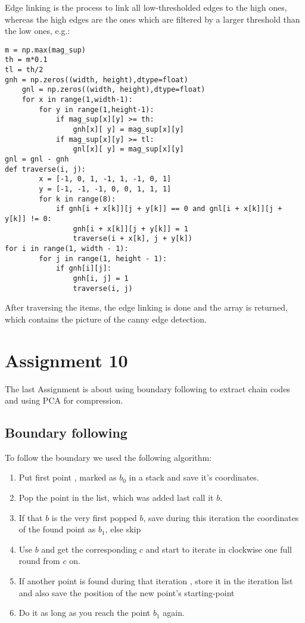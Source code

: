 Edge linking is the process to link all low-thresholded edges to the high ones, whereas the high edges are the ones which are filtered by a larger threshold than the low ones, e.g.:
\begin{verbatim}
m = np.max(mag_sup)      
th = m*0.1
tl = th/2
gnh = np.zeros((width, height),dtype=float)
    gnl = np.zeros((width, height),dtype=float)
    for x in range(1,width-1):
        for y in range(1,height-1):
            if mag_sup[x][y] >= th:
                gnh[x][ y] = mag_sup[x][y]
            if mag_sup[x][y] >= tl:
                gnl[x][ y] = mag_sup[x][y]
gnl = gnl - gnh
def traverse(i, j):
        x = [-1, 0, 1, -1, 1, -1, 0, 1]
        y = [-1, -1, -1, 0, 0, 1, 1, 1]
        for k in range(8):
            if gnh[i + x[k]][j + y[k]] == 0 and gnl[i + x[k]][j + y[k]] != 0:
                gnh[i + x[k]][j + y[k]] = 1
                traverse(i + x[k], j + y[k])
for i in range(1, width - 1):
        for j in range(1, height - 1):
            if gnh[i][j]:
                gnh[i, j] = 1
                traverse(i, j)
\end{verbatim}               
After traversing the items, the edge linking is done and the array is returned, which contains the picture of the canny edge detection.


\section{Assignment 10}

The last Assignment is about using boundary following to extract chain codes and using PCA for compression.

\subsection{Boundary following}

To follow the boundary we used the following algorithm:
\begin{enumerate}
\item Put first point , marked as $b_0$ in a stack and save it's coordinates.
\item Pop the point in the list, which was added last call it $b$.
\item If that $b$ is the very first popped $b$, save during this iteration the coordinates of the found point as $b_1$, else skip
\item Use $b$ and get the corresponding $c$ and start to iterate in clockwise one full round from $c$ on.
\item If another point is found during that iteration , store it in the iteration list and also save the position of the new point's starting-point 
\item Do it as long as you reach the point $b_1$ again.
\end{enumerate}

